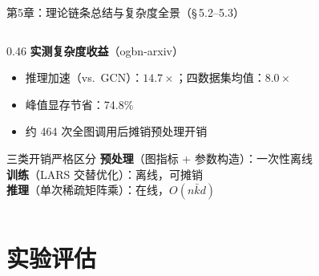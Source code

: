 \documentclass[aspectratio=169,9pt,xcolor=dvipsnames]{beamer}
\newcommand{\highlight}[1]{\textcolor{myred}{\textbf{#1}}}
\newcommand{\blue}[1]{\textcolor{mynavy}{#1}}
\newcommand{\kbar}{\ensuremath{\bar{k}}}
\begin{document}
\begin{frame}{第5章：理论链条总结与复杂度全景（§\,5.2--5.3）}
\begin{columns}[T]
\begin{column}{0.46\textwidth}
      \vspace{0.15cm}
      \textbf{实测复杂度收益}（ogbn-arxiv）
      \begin{itemize}
        \item 推理加速（vs.\ GCN）：\blue{$14.7\times$}；四数据集均值：\blue{$8.0\times$}
        \item 峰值显存节省：\blue{74.8\%}
        \item 约 \blue{464 次}全图调用后摊销预处理开销
      \end{itemize}

      \vspace{0.1cm}
      \begin{alertblock}{三类开销严格区分}
        \textbf{预处理}（图指标 + 参数构造）：一次性离线\\
        \textbf{训练}（LARS 交替优化）：离线，可摊销\\
        \textbf{推理}（单次稀疏矩阵乘）：在线，\highlight{$O(n\kbar d)$}
      \end{alertblock}
    \end{column}
  \end{columns}
\end{frame}

\section{实验评估}
\end{document}

